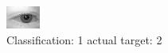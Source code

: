 \begin{figure}[h!]
\begin{center}
\includegraphics[width=0.60\columnwidth]{figures/ID421_class_1_target_2.png}
\end{center}
\caption{ Classification: 1 actual target: 2}
\label{fig:ID421_class_1_target_2}
\end{figure}
